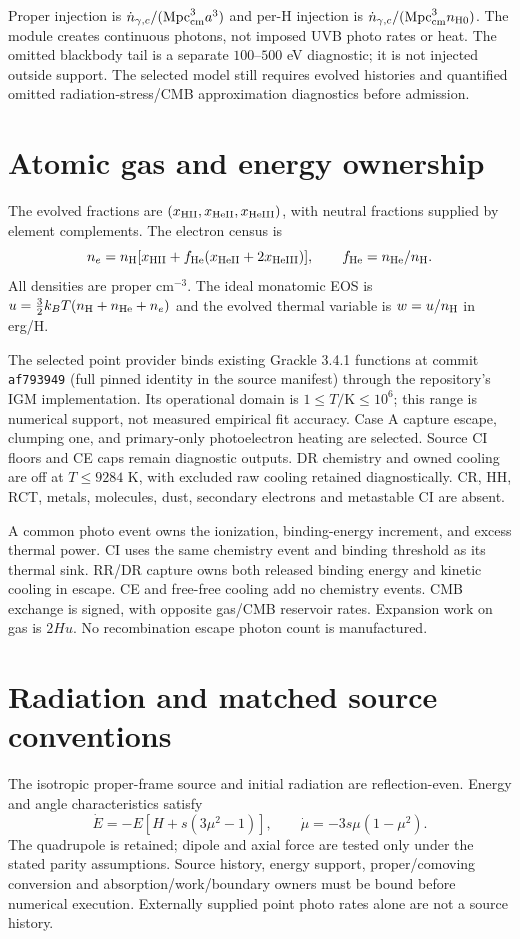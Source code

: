 \documentclass[11pt]{article}
\begin{document}
Proper injection is $\dot n_{\gamma,c}/(\mathrm{Mpc}_{\rm cm}^3a^3)$ and per-H injection is $\dot n_{\gamma,c}/(\mathrm{Mpc}_{\rm cm}^3n_{\rm H0})$. The module creates continuous photons, not imposed UVB photo rates or heat. The omitted blackbody tail is a separate $100$--$500$ eV diagnostic; it is not injected outside support. The selected model still requires evolved histories and quantified omitted radiation-stress/CMB approximation diagnostics before admission.

\section{Atomic gas and energy ownership}
The evolved fractions are $(x_{\rm HII},x_{\rm HeII},x_{\rm HeIII})$, with neutral fractions supplied by element complements. The electron census is
\begin{equation}
 n_e=n_{\rm H}[x_{\rm HII}+f_{\rm He}(x_{\rm HeII}+2x_{\rm HeIII})],\qquad f_{\rm He}=n_{\rm He}/n_{\rm H}.
\end{equation}
All densities are proper $\mathrm{cm}^{-3}$. The ideal monatomic EOS is $u=\frac32 k_BT(n_{\rm H}+n_{\rm He}+n_e)$ and the evolved thermal variable is $w=u/n_{\rm H}$ in erg/H.

The selected point provider binds existing Grackle 3.4.1 functions at commit \texttt{af793949} (full pinned identity in the source manifest) through the repository's IGM implementation\cite{grackle}. Its operational domain is $1\le T/\mathrm K\le10^6$; this range is numerical support, not measured empirical fit accuracy. Case A capture escape, clumping one, and primary-only photoelectron heating are selected. Source CI floors and CE caps remain diagnostic outputs. DR chemistry and owned cooling are off at $T\le9284$ K, with excluded raw cooling retained diagnostically. CR, HH, RCT, metals, molecules, dust, secondary electrons and metastable CI are absent.

A common photo event owns the ionization, binding-energy increment, and excess thermal power. CI uses the same chemistry event and binding threshold as its thermal sink. RR/DR capture owns both released binding energy and kinetic cooling in escape. CE and free-free cooling add no chemistry events. CMB exchange is signed, with opposite gas/CMB reservoir rates. Expansion work on gas is $2Hu$. No recombination escape photon count is manufactured.

\section{Radiation and matched source conventions}
The isotropic proper-frame source and initial radiation are reflection-even. Energy and angle characteristics satisfy
\begin{equation}
 \dot E=-E[H+s(3\mu^2-1)],\qquad \dot\mu=-3s\mu(1-\mu^2).
\end{equation}
The quadrupole is retained; dipole and axial force are tested only under the stated parity assumptions. Source history, energy support, proper/comoving conversion and absorption/work/boundary owners must be bound before numerical execution. Externally supplied point photo rates alone are not a source history.
\end{document}
